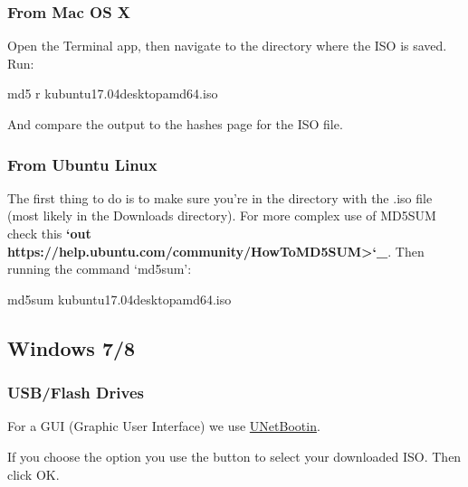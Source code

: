 \documentclass[letterpaper,10pt,english]{sphinxmanual}
\begin{document}
\subsubsection{From Mac OS X}
\label{\detokenize{docs/installation:from-mac-os-x}}
Open the Terminal app, then navigate to the directory where the ISO is saved.
Run:

\begin{sphinxVerbatim}[commandchars=\\\{\}]
md5 \PYGZhy{}r kubuntu\PYGZhy{}17.04\PYGZhy{}desktop\PYGZhy{}amd64.iso
\end{sphinxVerbatim}

And compare the output to the hashes page for the ISO file.


\subsubsection{From Ubuntu Linux}
\label{\detokenize{docs/installation:from-ubuntu-linux}}
The first thing to do is to make sure you're in the directory with the .iso file (most likely in the Downloads directory). For more complex use of MD5SUM check this {\color{red}\bfseries{}{}`out https://help.ubuntu.com/community/HowToMD5SUM\textgreater{}{}`\_}. Then running the command `md5sum':

\begin{sphinxVerbatim}[commandchars=\\\{\}]
md5sum kubuntu\PYGZhy{}17.04\PYGZhy{}desktop\PYGZhy{}amd64.iso
\end{sphinxVerbatim}


\subsection{Windows 7/8}
\label{\detokenize{docs/installation:windows-7-8}}

\subsubsection{USB/Flash Drives}
\label{\detokenize{docs/installation:usb-flash-drives}}\label{\detokenize{docs/installation:usb-drives-link}}
For a GUI (Graphic User Interface) we use \href{http://unetbootin\_link/}{UNetBootin}.

If you choose the  option you use the  button to select your downloaded ISO. Then click OK.

\end{document}
